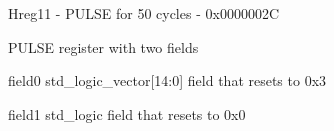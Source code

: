 \documentclass{article}
\begin{document}
\begin{register}{H}{reg11 - PULSE for 50 cycles - }{0x0000002C}  \par PULSE register with two fields \regnewline
  \label{reg11}
\regnewline
  \begin{regdesc}\begin{reglist}[field0]
    \item [field0] std{\_}logic{\_}vector[14:0] field that resets to 0x3    \item [field1] std{\_}logic field that resets to 0x0  \end{reglist}\end{regdesc}
\end{register}
\end{document}
